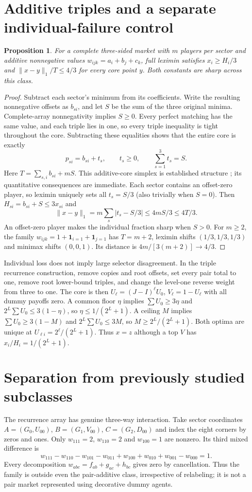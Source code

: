 \documentclass[11pt]{article}
\newtheorem{proposition}{Proposition}
\begin{document}
\section{Additive triples and a separate individual-failure control}
\begin{proposition}\label{prop:additive}
For a complete three-sided market with $m$ players per sector and
additive nonnegative values $w_{ijk}=a_i+b_j+c_k$, full leximin satisfies
$x_i\ge H_i/3$ and $\|x-y\|_1/T\le4/3$ for every core point $y$.
Both constants are sharp across this class.
\end{proposition}
\begin{proof}
Subtract each sector's minimum from its coefficients. Write the resulting
nonnegative offsets as $b_{si}$, and let $S$ be the sum of the three original
minima. Complete-array nonnegativity implies $S\ge0$. Every perfect matching
has the same value, and each triple lies in one, so every triple inequality
is tight throughout the core. Subtracting these equalities shows that the
entire core is exactly
\[
 p_{si}=b_{si}+t_s,\qquad t_s\ge0,\qquad\sum_{s=1}^3t_s=S.
\]
Here $T=\sum_{s,i}b_{si}+mS$. This additive-core simplex is established
structure \cite{assortative}; its quantitative consequences are immediate. Each sector contains an offset-zero
player, so leximin uniquely sets all $t_s=S/3$ (also trivially when $S=0$).
Then $H_{si}=b_{si}+S\le3x_{si}$ and
\[
 \|x-y\|_1=m\sum_s|t_s-S/3|\le4mS/3\le4T/3.
\]
An offset-zero player makes the individual fraction sharp when $S>0$.
For $m\ge2$, the family $w_{ijk}=1+\mathbf1_{i=1}+\mathbf1_{j=1}$ has $T=m+2$,
leximin shifts $(1/3,1/3,1/3)$ and minimax shifts $(0,0,1)$. Its distance is
$4m/[3(m+2)]\to4/3$.
\end{proof}

Individual loss does not imply large selector disagreement. In the triple
recurrence construction, remove copies and root offsets, set every pair total
to one, remove root lower-bound triples, and change the level-one reverse
weight from three to one. The core is then $U_\ell=(J-I)^\ell U_0$,
$V_\ell=1-U_\ell$ with all dummy payoffs zero. A common floor $\eta$ implies
$\sum U_0\ge3\eta$ and $2^L\sum U_0\le3(1-\eta)$, so
$\eta\le1/(2^L+1)$. A ceiling $M$ implies $\sum U_0\ge3(1-M)$ and
$2^L\sum U_0\le3M$, so $M\ge2^L/(2^L+1)$. Both optima are unique at
$U_{\ell i}=2^\ell/(2^L+1)$. Thus $x=z$ although a top $V$ has
$x_i/H_i=1/(2^L+1)$.

\section{Separation from previously studied subclasses}
The recurrence array has genuine three-way interaction. Take sector coordinates
$A=(G_0,U_{00})$, $B=(G_1,V_{00})$, $C=(G_2,D_{00})$ and index the eight
corners by zeros and ones. Only $w_{111}=2$, $w_{110}=2$ and $w_{100}=1$
are nonzero. Its third mixed difference is
\[
 w_{111}-w_{110}-w_{101}-w_{011}+w_{100}+w_{010}+w_{001}-w_{000}=1.
\]
Every decomposition $w_{abc}=f_{ab}+g_{ac}+h_{bc}$ gives zero by cancellation.
Thus the family is outside even the pair-additive class, irrespective of
relabeling; it is not a pair market represented using decorative dummy agents.
\end{document}
